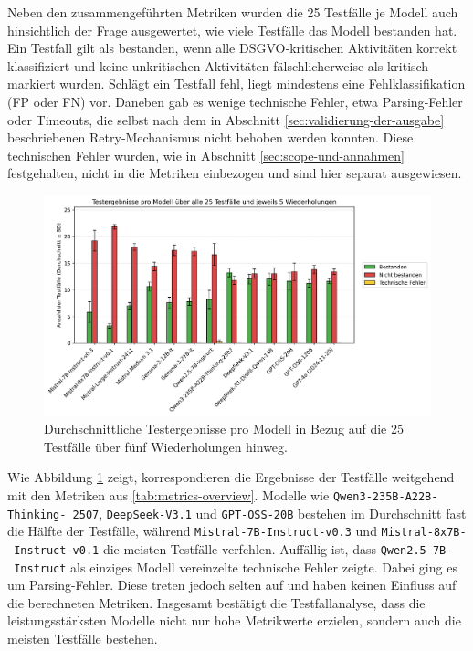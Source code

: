 Neben den zusammengeführten Metriken wurden die 25 Testfälle je Modell auch hinsichtlich der Frage ausgewertet, wie viele Testfälle das Modell bestanden hat. Ein Testfall gilt als bestanden, wenn alle \ac{DSGVO}‑kritischen Aktivitäten korrekt klassifiziert und keine unkritischen Aktivitäten fälschlicherweise als kritisch markiert wurden. Schlägt ein Testfall fehl, liegt mindestens eine Fehlklassifikation (\ac{FP} oder \ac{FN}) vor. Daneben gab es wenige technische Fehler, etwa Parsing‑Fehler oder Timeouts, die selbst nach dem in Abschnitt  \ref{sec:validierung-der-ausgabe} beschriebenen Retry‑Mechanismus nicht behoben werden konnten. Diese technischen Fehler wurden, wie in Abschnitt \ref{sec:scope-und-annahmen} festgehalten, nicht in die Metriken einbezogen und sind hier separat ausgewiesen.

\begin{figure}[htbp]
    \centering
    \includegraphics[width=\textwidth]{images/results/evaluation_testcase_outcomes_grouped}
    \caption{Durchschnittliche Testergebnisse pro Modell in Bezug auf die 25 Testfälle über fünf Wiederholungen hinweg.}
    \label{fig:results-testcase-outcomes}
\end{figure}

Wie Abbildung \ref{fig:results-testcase-outcomes} zeigt, korrespondieren die Ergebnisse der Testfälle weitgehend mit den Metriken aus \autoref{tab:metrics-overview}. Modelle wie \texttt{Qwen3-235B-A22B-Thinking-\linebreak~2507}, \texttt{DeepSeek-V3.1} und \texttt{GPT-OSS-20B} bestehen im Durchschnitt fast die Hälfte der Testfälle, während \texttt{Mistral-7B-Instruct-v0.3} und \texttt{Mistral-8x7B-\linebreak~Instruct-v0.1} die meisten Testfälle verfehlen. Auffällig ist, dass \texttt{Qwen2.5-7B-\linebreak~Instruct} als einziges Modell vereinzelte technische Fehler zeigte. Dabei ging es um Parsing-Fehler. Diese treten jedoch selten auf und haben keinen Einfluss auf die berechneten Metriken. Insgesamt bestätigt die Testfallanalyse, dass die leistungsstärksten Modelle nicht nur hohe Metrikwerte erzielen, sondern auch die meisten Testfälle bestehen.